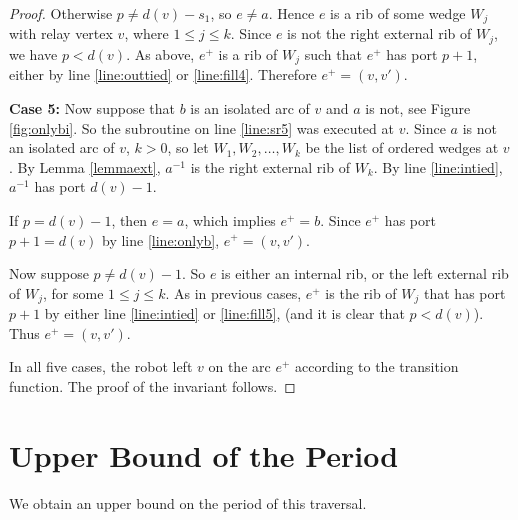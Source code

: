 \documentclass[12pt,letterpaper,oneside]{book}
\begin{document}
\begin{proof}
Otherwise $p\ne d(v)-s_1$, so $e\ne a$.  Hence $e$ is a rib of some wedge $W_j$ with relay vertex $v$, where $1\le j\le k$.  
Since $e$ is not the right external rib of $W_j$, we have $p<d(v)$. 
As above, $e^+$ is a rib of $W_{j}$ such that $e^+$ has port $p+1$, either by line \ref{line:outtied} 
or \ref{line:fill4}.    
Therefore $e^+=(v,v')$.  

\noindent\textbf{Case 5: } Now suppose that $b$ is an isolated arc of $v$ and $a$ is not, see Figure \ref{fig:onlybi}.  So 
the subroutine on line \ref{line:sr5} was executed at $v$.  
Since $a$ is not an isolated arc of $v$, $k>0$, so let $W_1,W_2,\ldots,W_k$ be the list of ordered wedges at $v$.  By 
Lemma \ref{lemmaext}, 
$a^{-1}$ is the right external rib of $W_k$.  By line \ref{line:intied}, $a^{-1}$ has 
port $d(v)-1$.  

If $p=d(v)-1$, then $e=a$, which 
implies $e^+ =b$.  Since $e^+$ has port $p+1=d(v)$ by line \ref{line:onlyb}, $e^+=(v,v')$. 

Now suppose $p\ne d(v)-1$.  
So $e$ is either an internal rib, or the left external rib of $W_j$, for some $1\le j\le k$.  As in previous cases, 
$e^+$ is the rib of $W_j$ that has port $p+1$ by either line \ref{line:intied} or \ref{line:fill5}, 
(and it is clear that $p<d(v)$).  Thus $e^+=(v,v')$. 



 
In all five cases, the robot left $v$ on the arc $e^+$ according to the transition function.  
The proof of the invariant follows.





\end{proof}

\newpage
\section{Upper Bound of the Period} \label{umain}

 We obtain an upper bound on the period of this traversal.  
 
\end{document}
